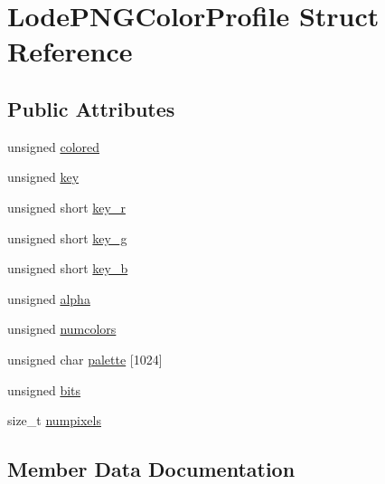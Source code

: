 \hypertarget{struct_lode_p_n_g_color_profile}{}\section{Lode\+P\+N\+G\+Color\+Profile Struct Reference}
\label{struct_lode_p_n_g_color_profile}
\subsection*{Public Attributes}
\begin{DoxyCompactItemize}
\item 
unsigned \mbox{\hyperlink{struct_lode_p_n_g_color_profile_abf063a566a4ab9f4d71b49764573d610}{colored}}
\item 
unsigned \mbox{\hyperlink{struct_lode_p_n_g_color_profile_a24f19f400a53672340877eefbc837b0c}{key}}
\item 
unsigned short \mbox{\hyperlink{struct_lode_p_n_g_color_profile_a0398985ae0572ef97e83c33c7486cafd}{key\+\_\+r}}
\item 
unsigned short \mbox{\hyperlink{struct_lode_p_n_g_color_profile_aba03e973374bd15315b8c01b86e94e8f}{key\+\_\+g}}
\item 
unsigned short \mbox{\hyperlink{struct_lode_p_n_g_color_profile_a39b65ec69f6aaee3ee7312a993f21e40}{key\+\_\+b}}
\item 
unsigned \mbox{\hyperlink{struct_lode_p_n_g_color_profile_a554fea329af8034e91e1cdd8c1af0d90}{alpha}}
\item 
unsigned \mbox{\hyperlink{struct_lode_p_n_g_color_profile_afdce0f5fbec46d6b8f1ec63da0a285f9}{numcolors}}
\item 
unsigned char \mbox{\hyperlink{struct_lode_p_n_g_color_profile_a223f8bee4c9ae8be0b70cc08f19aaead}{palette}} \mbox{[}1024\mbox{]}
\item 
unsigned \mbox{\hyperlink{struct_lode_p_n_g_color_profile_a1d3870b03dfe6d699bf4c968c9bc1890}{bits}}
\item 
size\+\_\+t \mbox{\hyperlink{struct_lode_p_n_g_color_profile_a12de3184a6f953e34e2b8551b806f556}{numpixels}}
\end{DoxyCompactItemize}


\subsection{Member Data Documentation}
\mbox{\label{struct_lode_p_n_g_color_profile_a554fea329af8034e91e1cdd8c1af0d90}} 
